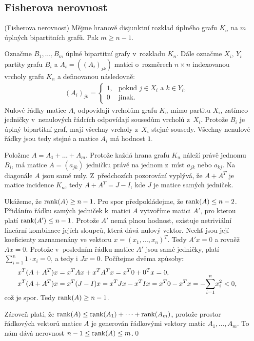 \subsection{Fisherova nerovnost}


\vt (Fisherova nerovnost) Mějme hranově disjunktní rozklad úplného grafu $K_n$ na $m$ úplných 
bipartitních grafů. Pak $m \geq n-1$.

\dk Označme $B_1, \ldots, B_m$ úplné bipartitní grafy v~rozkladu $K_n$. Dále označme $X_i$, $Y_i$ partity grafu $B_i$ a $A_i=((A_i)_{jk})$ matici o~rozměrech $n \times n$ indexovanou vrcholy grafu $K_n$ a definovanou následovně:
\begin{align}
	(A_i)_{jk} = \begin{cases}1, & \text{pokud } j \in X_i\text{ a }k \in Y_i, \\
	0 & \text{jinak.} \end{cases}
\end{align}
Nulové řádky matice $A_i$ odpovídají vrcholům grafu $K_n$ mimo partitu $X_i$, zatímco jedničky v~nenulových řádcích odpovídají sousedům vrcholů z~$X_i$. Protože $B_i$ je úplný bipartitní graf, mají všechny vrcholy z~$X_i$ stejné sousedy. Všechny nenulové řádky jsou tedy stejné a matice $A_i$ má hodnost $1$.

Položme $A=A_1 + \ldots + A_m$. Protože každá hrana grafu $K_n$ náleží právě jednomu $B_i$, má matice $A=(a_{jk})$ jedničku právě na 
jednom z~míst $a_{jk}$ nebo $a_{kj}$. Na diagonále $A$ jsou samé nuly. Z~předchozích pozorování vyplývá, že $A+A^T$ je matice incidence $K_n$, tedy $A+A^T=J-I$, kde $J$ je matice samých jedniček.

Ukážeme, že $\operatorname{rank}(A) \geq n-1$. Pro spor předpokládejme, že $\operatorname{rank}(A) \leq n-2$. Přidáním řádku samých jedniček k~matici $A$ vytvoříme matici $A'$, pro kterou platí $\operatorname{rank}(A')\leq n-1$. Protože $A'$ nemá plnou hodnost, existuje netriviální lineární kombinace jejích sloupců, která dává nulový vektor. Nechť jsou její koeficienty zaznamenány ve vektoru $x=(x_1,\dots,x_n)^T$. Tedy $A'x=0$ a rovněž $Ax=0$. Protože v~posledním řádku matice $A'$ jsou samé jedničky, platí $\sum_{i=1}^n 1\cdot x_i = 0$, a tedy i $Jx=0$. Počítejme dvěma způsoby:
\begin{align}
  x^T(A+A^T) x &= x^TAx + x^TA^Tx = x^T0+0^Tx= 0,\\
	x^T(A+A^T) x &= x^T(J - I)x = x^TJx - x^TIx = x^T0 - x^Tx = -\smash{\sum_{i=1}^n} x_i^2 < 0,
\end{align}
což je spor. Tedy $\operatorname{rank}(A) \geq n-1$.

Zároveň platí, že $\operatorname{rank}(A)\leq\operatorname{rank}(A_1)+\dots+\operatorname{rank}(A_m)$, protože prostor řádkových vektorů matice $A$ je generován řádkovými vektory matic $A_1,\dots,A_m$. To nám dává nerovnost $n-1\leq\operatorname{rank}(A)\leq m$.\qed